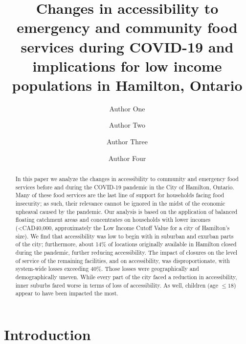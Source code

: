 \documentclass[]{elsarticle} %
\begin{document}
\begin{frontmatter}

  \title{Changes in accessibility to emergency and community food
services during COVID-19 and implications for low income populations in
Hamilton, Ontario}
    \author[Some University]{Author One}
    \author[Another University]{Author Two}
    \author[Some University]{Author Three}
    \author[Some University]{Author Four}
      \address[Some University]{Department, Street, City, State, Zip}
    \address[Another University]{Department, Street, City, State, Zip}
  
  \begin{abstract}
  In this paper we analyze the changes in accessibility to community and
  emergency food services before and during the COVID-19 pandemic in the
  City of Hamilton, Ontario. Many of these food services are the last
  line of support for households facing food insecurity; as such, their
  relevance cannot be ignored in the midst of the economic upheaval
  caused by the pandemic. Our analysis is based on the application of
  balanced floating catchment areas and concentrates on households with
  lower incomes (\textless CAD40,000, approximately the Low Income
  Cutoff Value for a city of Hamilton's size). We find that
  accessibility was low to begin with in suburban and exurban parts of
  the city; furthermore, about 14\% of locations originally available in
  Hamilton closed during the pandemic, further reducing accessibility.
  The impact of closures on the level of service of the remaining
  facilities, and on accessibility, was disproportionate, with
  system-wide losses exceeding 40\%. Those losses were geographically
  and demographically uneven. While every part of the city faced a
  reduction in accessibility, inner suburbs fared worse in terms of loss
  of accessibility. As well, children (age \(\le 18\)) appear to have
  been impacted the most.
  \end{abstract}
  
 \end{frontmatter}

\hypertarget{introduction}{%
\section{Introduction}\label{introduction}}
\end{document}
